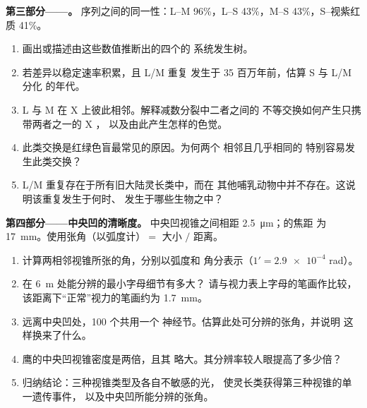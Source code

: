 \begin{problem}
\medskip
\noindent\textbf{第三部分——。}
序列之间的同一性：L--M 96\%，L--S 43\%，M--S
43\%，S--视紫红质 41\%。
\begin{enumerate}[resume]
  \item 画出或描述由这些数值推断出的四个的
        系统发生树。
  \item 若差异以稳定速率积累，且 L/M 重复
        发生于 35 百万年前，估算 S 与 L/M 分化
        的年代。
  \item L 与 M 在 X 上彼此相邻。解释减数分裂中二者之间的
        不等交换如何产生只携带两者之一的 X ，
        以及由此产生怎样的色觉。
  \item 此类交换是红绿色盲最常见的原因。为何两个
        相邻且几乎相同的
        特别容易发生此类交换？
  \item L/M 重复存在于所有旧大陆灵长类中，而在
        其他哺乳动物中并不存在。这说明该重复发生于何时、
        发生于哪些生物之中？
\end{enumerate}

\medskip
\noindent\textbf{第四部分——中央凹的清晰度。}
中央凹视锥之间相距 \qty{2.5}{\micro m}；的焦距
为 \qty{17}{mm}。使用张角（以弧度计）$=$ 大小 $/$ 距离。
\begin{enumerate}[resume]
  \item 计算两相邻视锥所张的角，分别以弧度和
        角分表示（$1' = \num{2.9e-4}$ rad）。
  \item 在 \qty{6}{m} 处能分辨的最小字母细节有多大？
        请与视力表上字母的笔画作比较，
        该距离下“正常”视力的笔画约为 \qty{1.7}{mm}。
  \item 远离中央凹处，100 个共用一个
        神经节。估算此处可分辨的张角，并说明
        这样换来了什么。
  \item 鹰的中央凹视锥密度是两倍，且其
        略大。其分辨率较人眼提高了多少倍？
  \item 归纳结论：三种视锥类型及各自不敏感的光，
        使灵长类获得第三种视锥的单一遗传事件，
        以及中央凹所能分辨的张角。
\end{enumerate}
\end{problem}
